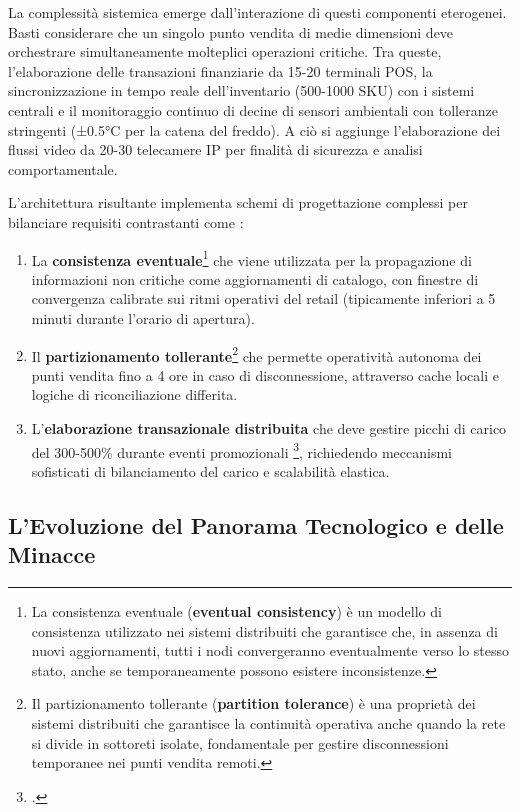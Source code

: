 La complessità sistemica emerge dall'interazione di questi componenti eterogenei. Basti considerare che un singolo punto vendita di medie dimensioni deve orchestrare simultaneamente molteplici operazioni critiche. Tra queste, l'elaborazione delle transazioni finanziarie da 15-20 terminali POS, la sincronizzazione in tempo reale dell'inventario (500-1000 SKU) con i sistemi centrali e il monitoraggio continuo di decine di sensori ambientali con tolleranze stringenti (±0.5°C per la catena del freddo). A ciò si aggiunge l'elaborazione dei flussi video da 20-30 telecamere IP per finalità di sicurezza e analisi comportamentale.

L'architettura risultante implementa schemi di progettazione complessi per bilanciare requisiti contrastanti come :
\begin{enumerate}
    \item La \textbf{consistenza eventuale}\footnote{La consistenza eventuale (\textbf{eventual consistency}) è un modello di consistenza utilizzato nei sistemi distribuiti che garantisce che, in assenza di nuovi aggiornamenti, tutti i nodi convergeranno eventualmente verso lo stesso stato, anche se temporaneamente possono esistere inconsistenze.} che viene utilizzata per la propagazione di informazioni non critiche come aggiornamenti di catalogo, con finestre di convergenza calibrate sui ritmi operativi del retail (tipicamente inferiori a 5 minuti durante l'orario di apertura).
    \item Il \textbf{partizionamento tollerante}\footnote{Il partizionamento tollerante (\textbf{partition tolerance}) è una proprietà dei sistemi distribuiti che garantisce la continuità operativa anche quando la rete si divide in sottoreti isolate, fondamentale per gestire disconnessioni temporanee nei punti vendita remoti.} che permette operatività autonoma dei punti vendita fino a 4 ore in caso di disconnessione, attraverso cache locali e logiche di riconciliazione differita.
    \item L'\textbf{elaborazione transazionale distribuita} che deve gestire picchi di carico del 300-500\% durante eventi promozionali \footcite{Osservatorio2024}, richiedendo meccanismi sofisticati di bilanciamento del carico e scalabilità elastica.
\end{enumerate}

\subsection{\texorpdfstring{\textbf{L'Evoluzione del Panorama Tecnologico e delle Minacce}}{1.1.2 - L'Evoluzione del Panorama Tecnologico e delle Minacce}}
\label{ssec:evoluzione_tecnologica_minacce}

